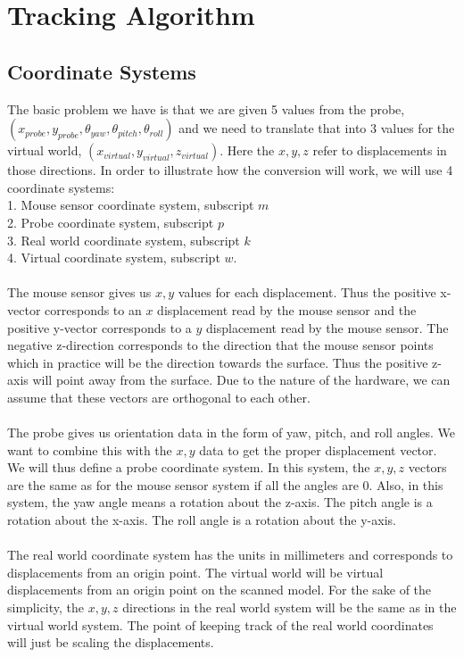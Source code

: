 \documentclass[conference]{acmsiggraph}
\begin{document}
\section{Tracking Algorithm}

\subsection{Coordinate Systems}

The basic problem we have is that we are given 5 values from the probe, $(x_{probe},y_{probe},\theta_{yaw},\theta_{pitch},\theta_{roll})$ and we need to translate that into 3 values for the virtual world, $(x_{virtual},y_{virtual},z_{virtual})$. Here the $x,y,z$ refer to displacements in those directions. In order to illustrate how the conversion will work, we will use 4 coordinate systems:\\
1. Mouse sensor coordinate system, subscript $m$\\
2. Probe coordinate system,  subscript $p$\\
3. Real world coordinate system, subscript $k$\\
4. Virtual coordinate system, subscript $w$.\\
\\
The mouse sensor gives us $x,y$ values for each displacement. Thus the positive x-vector corresponds to an $x$ displacement read by the mouse sensor and the positive y-vector corresponds to a $y$ displacement read by the mouse sensor. The negative z-direction corresponds to the direction that the mouse sensor points which in practice will be the direction towards the surface. Thus the positive z-axis will point away from the surface. Due to the nature of the hardware, we can assume that these vectors are orthogonal to each other.\\
\\
The probe gives us orientation data in the form of yaw, pitch, and roll angles. We want to combine this with the $x,y$ data to get the proper displacement vector. We will thus define a probe coordinate system. In this system, the $x,y,z$ vectors are the same as for the mouse sensor system if all the angles are $0$. Also, in this system, the yaw angle means a rotation about the z-axis. The pitch angle is a rotation about the x-axis. The roll angle is a rotation about the y-axis. \\
\\
The real world coordinate system has the units in millimeters and corresponds to displacements from an origin point. The virtual world will be virtual displacements from an origin point on the scanned model. For the sake of the simplicity, the $x,y,z$ directions in the real world system will be the same as in the virtual world system. The point of keeping track of the real world coordinates will just be scaling the displacements. \\
\end{document}
